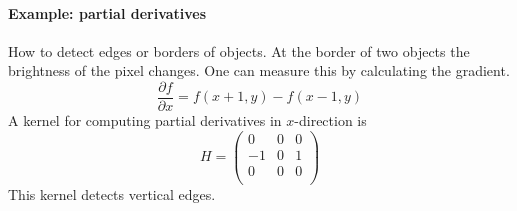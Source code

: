 \documentclass[10pt,a4paper]{article}
\begin{document}
\paragraph{Example: partial derivatives}
How to detect edges or borders of objects. At the border of two objects the brightness of the pixel changes. One can measure this by calculating the gradient.
\[ \frac{\partial f}{\partial x} = f(x+1,y) - f(x-1,y) \]
A kernel for computing partial derivatives in $x$-direction is
\[ H = \begin{pmatrix}
0 & 0 & 0\\
-1 & 0 & 1\\
0 & 0 & 0\\
\end{pmatrix} \]
This kernel detects vertical edges.
\end{document}
